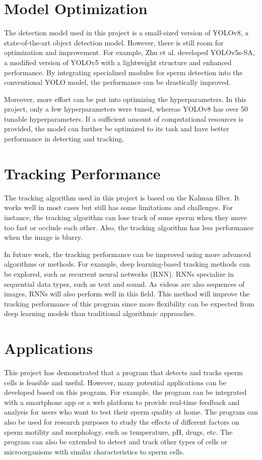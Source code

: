 \section{Model Optimization}
The detection model used in this project is a small-sized version of YOLOv8, a state-of-the-art object detection model. However, there is still room for optimization and improvement. For example, Zhu et al. developed YOLOv5s-SA, a modified version of YOLOv5 with a lightweight structure and enhanced performance. \cite{deep7} By integrating specialized modules for sperm detection into the conventional YOLO model, the performance can be drastically improved. 

Moreover, more effort can be put into optimizing the hyperparameters. In this project, only a few hyperparameters were tuned, whereas YOLOv8 has over 50 tunable hyperparameters. If a sufficient amount of computational resources is provided, the model can further be optimized to its task and have better performance in detecting and tracking.

\section{Tracking Performance}
The tracking algorithm used in this project is based on the Kalman filter. It works well in most cases but still has some limitations and challenges. For instance, the tracking algorithm can lose track of some sperm when they move too fast or occlude each other. Also, the tracking algorithm has less performance when the image is blurry. 

In future work, the tracking performance can be improved using more advanced algorithms or methods. For example, deep learning-based tracking methods can be explored, such as recurrent neural networks (RNN). RNNs specialize in sequential data types, such as text and sound. As videos are also sequences of images, RNNs will also perform well in this field. This method will improve the tracking performance of this program since more flexibility can be expected from deep learning models than traditional algorithmic approaches.

\section{Applications}
This project has demonstrated that a program that detects and tracks sperm cells is feasible and useful. However, many potential applications can be developed based on this program. For example, the program can be integrated with a smartphone app or a web platform to provide real-time feedback and analysis for users who want to test their sperm quality at home. The program can also be used for research purposes to study the effects of different factors on sperm motility and morphology, such as temperature, pH, drugs, etc. The program can also be extended to detect and track other types of cells or microorganisms with similar characteristics to sperm cells.